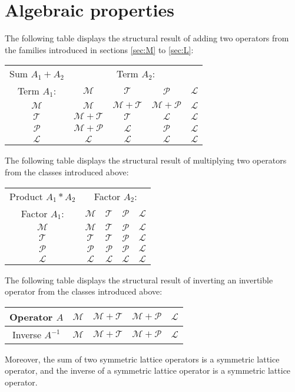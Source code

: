 \documentclass[12pt,a4paper]{article}
\newcommand{\Mop}{\mathcal{M}}
\newcommand{\Top}{\mathcal{T}}
\newcommand{\Pop}{\mathcal{P}}
\newcommand{\Lop}{\mathcal{L}}
\begin{document}
\section{Algebraic properties}

The following table displays the structural result of adding two operators from the families introduced in sections \ref{sec:M} to \ref{sec:L}:
\begin{center}
\begin{tabular}{|c|cccc|}
\hline
Sum $A_1+A_2$ & \multicolumn{4}{|c|}{Term $A_2$:} \\
\cline{1-1}
Term $A_1$: & $\Mop$ & $\Top$ & $\Pop$ & $\Lop$ \\
\cline{2-5}
$\Mop$ & $\Mop$ & $\Mop + \Top$ & $\Mop + \Pop$ & $\Lop$ \\
$\Top$ & $\Mop + \Top$ & $\Top$ & $\Lop$ & $\Lop$ \\
$\Pop$ & $\Mop + \Pop$ & $\Lop$ & $\Pop$ & $\Lop$ \\
$\Lop$ & $\Lop$ & $\Lop$ & $\Lop$ & $\Lop$ \\
\hline
\end{tabular}
\end{center}
The following table displays the structural result of multiplying two operators from the classes introduced above:
\begin{center}
\begin{tabular}{|c|cccc|}
\hline
Product $A_1 * A_2$ & \multicolumn{4}{|c|}{Factor $A_2$:} \\
\cline{1-1}
Factor $A_1$: & $\Mop$ & $\Top$ & $\Pop$ & $\Lop$ \\
\cline{2-5}
$\Mop$ & $\Mop$ & $\Top$ & $\Pop$ & $\Lop$ \\
$\Top$ & $\Top$ & $\Top$ & $\Pop$ & $\Lop$ \\
$\Pop$ & $\Pop$ & $\Pop$ & $\Pop$ & $\Lop$ \\
$\Lop$ & $\Lop$ & $\Lop$ & $\Lop$ & $\Lop$ \\
\hline
\end{tabular}
\end{center}
The following table displays the structural result of inverting an invertible operator from the classes introduced above:
\begin{center}
\begin{tabular}{|c|cccc|}
\hline
Operator $A$ & $\Mop$ & $\Mop+\Top$ & $\Mop+\Pop$ & $\Lop$ \\
\hline
Inverse $A^{-1}$ & $\Mop$ & $\Mop+\Top$ & $\Mop+\Pop$ & $\Lop$ \\
\hline
\end{tabular}
\end{center}
Moreover, the sum of two symmetric lattice operators is a symmetric lattice operator, and the inverse of a symmetric lattice operator is a symmetric lattice operator.
\end{document}
